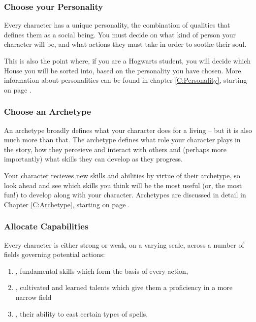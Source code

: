\subsubsection*{\itemlist{} Choose your Personality}

Every character has a unique personality, the combination of qualities that defines them as a social being. You must decide on what kind of person your character will be, and what actions they must take in order to soothe their soul. 

This is also the point where, if you are a Hogwarts student, you will decide which House you will be sorted into, based on the personality you have chosen. More information about personalities can be found in chapter \ref{C:Personality}, starting on page \pageref{C:Personality}.

\subsubsection*{\itemlist{} Choose an Archetype}

An archetype broadly defines what your character does for a living -- but it is also much more than that. The archetype defines what role your character plays in the story, how they perceieve and interact with others and (perhaps more importantly) what skills they can develop as they progress. 

Your character recieves new skills and abilities by virtue of their archetype, so look ahead and see which skills you think will be the most useful (or, the most fun!) to develop along with your character. Archetypes are discussed in detail in Chapter \ref{C:Archetype}, starting on page \pageref{C:Archetype}.

\subsubsection*{\itemlist{} Allocate Capabilities}

Every character is either strong or weak, on a varying scale, across a number of fields governing potential actions: 
\begin{enumerate}[itemsep=0em]
\item {}, fundamental skills which form the basis of every action,
\item {}, cultivated and learned talents which give them a proficiency in a more narrow field
\item {}, their ability to cast certain types of spells. 
\end{enumerate}

